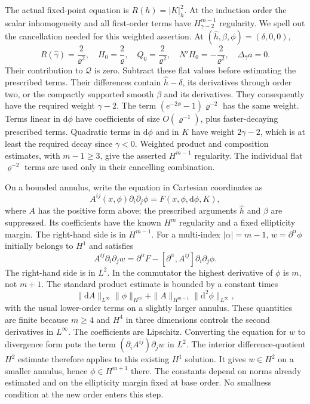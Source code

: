 \documentclass[
  english,
  11pt,
  reqno]{amsart}
\begin{document}
The actual fixed-point equation is \(R(h)=|K|_h^2\). At the induction
order the scalar inhomogeneity and all first-order terms have
\(H^{m-1}_{\gamma-2}\) regularity. We spell out the cancellation needed
for this weighted assertion. At
\((\widehat h,\beta,\phi)=(\delta,0,0)\), \[
R(\widehat\gamma)=\frac2{\varrho^2},
\quad H_0=\frac2\varrho,
\quad Q_0=\frac2{\varrho^2},
\quad N'H_0=-\frac2{\varrho^2},
\quad \Delta_{\widehat\gamma}a=0.
\] Their contribution to \(\mathcal Q\) is zero. Subtract these flat
values before estimating the prescribed terms. Their differences contain
\(\widehat h-\delta\), its derivatives through order two, or the
compactly supported smooth \(\beta\) and its derivatives. They
consequently have the required weight \(\gamma-2\). The term
\((e^{-2\phi}-1)\varrho^{-2}\) has the same weight. Terms linear in
\(\mathrm d\phi\) have coefficients of size \(O(\varrho^{-1})\), plus
faster-decaying prescribed terms. Quadratic terms in \(\mathrm d\phi\)
and in \(K\) have weight \(2\gamma-2\), which is at least the required
decay since \(\gamma<0\). Weighted product and composition estimates,
with \(m-1\ge3\), give the asserted \(H^{m-1}\) regularity. The
individual flat \(\varrho^{-2}\) terms are used only in their cancelling
combination.

On a bounded annulus, write the equation in Cartesian coordinates as%
\[
A^{ij}(x,\phi)\partial_i\partial_j\phi
=F(x,\phi,\mathrm d\phi,K),
\] where \(A\) has the positive form above; the prescribed arguments
\(\widehat h\) and \(\beta\) are suppressed. Its coefficients have the
known \(H^m\) regularity and a fixed ellipticity margin. The right-hand
side is in \(H^{m-1}\). For a multi-index \(|\alpha|=m-1\),
\(w=\partial^\alpha\phi\) initially belongs to \(H^1\) and satisfies \[
A^{ij}\partial_i\partial_jw
=\partial^\alpha F-
[\partial^\alpha,A^{ij}]\partial_i\partial_j\phi.
\] The right-hand side is in \(L^2\). In the commutator the highest
derivative of \(\phi\) is \(m\), not \(m+1\). The standard product
estimate is bounded by a constant times \[
\|\mathrm dA\|_{L^\infty}\|\phi\|_{H^m}
+\|A\|_{H^{m-1}}\|\mathrm d^2\phi\|_{L^\infty},
\] with the usual lower-order terms on a slightly larger annulus. These
quantities are finite because \(m\ge4\) and \(H^4\) in three dimensions
controls the second derivatives in \(L^\infty\). The coefficients are
Lipschitz. Converting the equation for \(w\) to divergence form puts the
term \((\partial_iA^{ij})\partial_jw\) in \(L^2\). The interior
difference-quotient \(H^2\) estimate therefore applies to this existing
\(H^1\) solution. It gives \(w\in H^2\) on a smaller annulus, hence
\(\phi\in H^{m+1}\) there. The constants depend on norms already
estimated and on the ellipticity margin fixed at base order. No
smallness condition at the new order enters this step.
\end{document}
